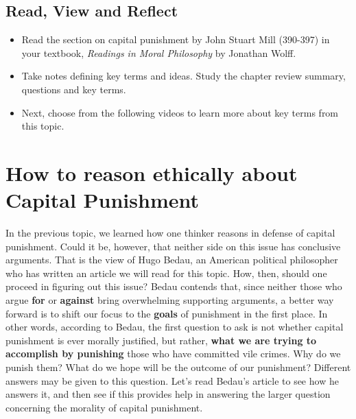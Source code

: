 \documentclass[
]{book}
\providecommand{\tightlist}{%
  \setlength{\itemsep}{0pt}\setlength{\parskip}{0pt}}
\begin{document}
\begin{reflect}
\hypertarget{read-view-and-reflect-26}{%
\subsection*{Read, View and Reflect}\label{read-view-and-reflect-26}}

\begin{itemize}
\tightlist
\item
  Read the section on capital punishment by John Stuart Mill (390-397) in your textbook, \emph{Readings in Moral Philosophy} by Jonathan Wolff.\\
\item
  Take notes defining key terms and ideas. Study the chapter review summary, questions and key terms.\\
\item
  Next, choose from the following videos to learn more about key terms from this topic.
\end{itemize}
\end{reflect}

\hypertarget{how-to-reason-ethically-about-capital-punishment}{%
\section*{How to reason ethically about Capital Punishment}\label{how-to-reason-ethically-about-capital-punishment}}

In the previous topic, we learned how one thinker reasons in defense of capital punishment. Could it be, however, that neither side on this issue has conclusive arguments. That is the view of Hugo Bedau, an American political philosopher who has written an article we will read for this topic.
How, then, should one proceed in figuring out this issue? Bedau contends that, since neither those who argue \textbf{for} or \textbf{against} bring overwhelming supporting arguments, a better way forward is to shift our focus to the \textbf{goals} of punishment in the first place.
In other words, according to Bedau, the first question to ask is not whether capital punishment is ever morally justified, but rather, \textbf{what we are trying to accomplish by punishing} those who have committed vile crimes. Why do we punish them? What do we hope will be the outcome of our punishment? Different answers may be given to this question. Let's read Bedau's article to see how he answers it, and then see if this provides help in answering the larger question concerning the morality of capital punishment.
\end{document}
